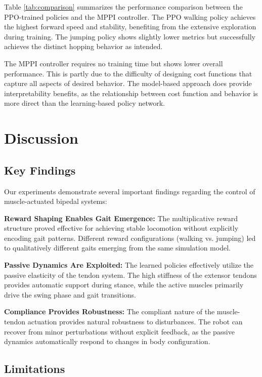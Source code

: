 \documentclass[conference]{IEEEtran}
\begin{document}
Table \ref{tab:comparison} summarizes the performance comparison between the PPO-trained policies and the MPPI controller. The PPO walking policy achieves the highest forward speed and stability, benefiting from the extensive exploration during training. The jumping policy shows slightly lower metrics but successfully achieves the distinct hopping behavior as intended.

The MPPI controller requires no training time but shows lower overall performance. This is partly due to the difficulty of designing cost functions that capture all aspects of desired behavior. The model-based approach does provide interpretability benefits, as the relationship between cost function and behavior is more direct than the learning-based policy network.

\section{Discussion}

\subsection{Key Findings}

Our experiments demonstrate several important findings regarding the control of muscle-actuated bipedal systems:

\textbf{Reward Shaping Enables Gait Emergence:} The multiplicative reward structure proved effective for achieving stable locomotion without explicitly encoding gait patterns. Different reward configurations (walking vs. jumping) led to qualitatively different gaits emerging from the same simulation model.

\textbf{Passive Dynamics Are Exploited:} The learned policies effectively utilize the passive elasticity of the tendon system. The high stiffness of the extensor tendons provides automatic support during stance, while the active muscles primarily drive the swing phase and gait transitions.

\textbf{Compliance Provides Robustness:} The compliant nature of the muscle-tendon actuation provides natural robustness to disturbances. The robot can recover from minor perturbations without explicit feedback, as the passive dynamics automatically respond to changes in body configuration.

\subsection{Limitations}
\end{document}
